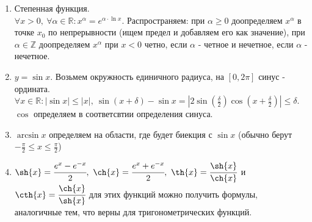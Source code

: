 \documentclass[a4paper, 12pt]{article}
\newcommand{\Z}{\mathbb{Z}}
\newcommand{\R}{\mathbb{R}}
\theoremstyle{definition}
\begin{document}
\begin{enumerate}
            \item Степенная функция.\\
            $\forall x>0,\ \forall \alpha\in\R: x^{\alpha}=e^{\alpha\cdot \ln{x}}$. Распространяем: при $\alpha \geq 0$ доопределяем $x^{\alpha}$ в точке $x_0$ по непрерывности (ищем предел и добавляем его как значение), при $\alpha\in \Z$ доопределяем $x^{\alpha}$ при $x<0$ четно, если $\alpha$ - четное и нечетное, если $\alpha$ - нечетное.
            \item $y=\sin{x}$. Возьмем окружность единичного радиуса, на $[0,2\pi]$ синус - ордината. $\forall x\in\R: |\sin{x}|\leq |x|,\ \sin{(x+\delta)}-\sin{x}=|2\sin{(\frac{\delta}{2})}\cos{(x+\frac{\delta}{2})}|\leq \delta$. $\cos$ определяем в соответсвтии определения синуса.
            \item $\arcsin{x}$ определяем на области, где будет биекция с $\sin{x}$ (обычно берут $-\frac{\pi}{2}\leq x\leq \frac{\pi}{2}$)
            \item $\sh{x}=\cfrac{e^x-e^{-x}}{2},\ \ch{x}=\cfrac{e^x+e^{-x}}{2},\ \th{x}=\cfrac{\sh{x}}{\ch{x}}$ и $\cth{x}=\cfrac{\ch{x}}{\sh{x}}$ для этих функций можно получить формулы, аналогичные тем, что верны для тригонометрических функций.
        \end{enumerate}
\end{document}
